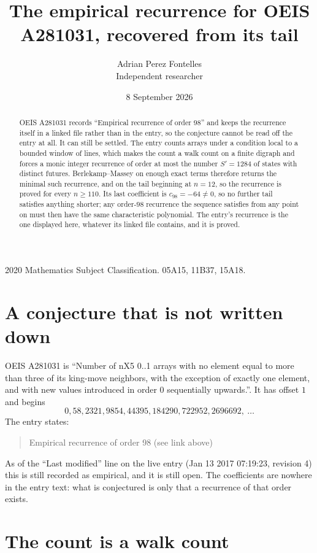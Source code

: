 \documentclass[11pt,a4paper]{article}
\title{The empirical recurrence for OEIS A281031, recovered from its tail}
\author{Adrian Perez Fontelles\\ \small Independent researcher}
\date{8 September 2026}
\theoremstyle{plain}
\theoremstyle{definition}
\begin{document}
\maketitle

\begin{abstract}
OEIS A281031 records ``Empirical recurrence of order $98$'' and keeps the recurrence itself in
a linked file rather than in the entry, so the conjecture cannot be read off the entry at all.
It can still be settled. The entry counts arrays under a condition local to a bounded window of
lines, which makes the count a walk count on a finite digraph and forces a monic integer
recurrence of order at most the number $S'=1284$ of states with distinct futures. Berlekamp--Massey on
enough exact terms therefore returns the minimal such recurrence, and on the tail beginning at $n=12$, so the recurrence is proved for every $n\ge110$.
Its last coefficient is $c_{98}=-64\neq0$, so no further tail satisfies anything
shorter; any order-$98$ recurrence the sequence satisfies from any point on must then have
the same characteristic polynomial. The entry's recurrence is the one displayed here, whatever
its linked file contains, and it is proved.
\end{abstract}

\noindent\small 2020 Mathematics Subject Classification. 05A15, 11B37, 15A18.\normalsize

\section{A conjecture that is not written down}

OEIS A281031 is ``Number of nX5 0..1 arrays with no element equal to more than three of its king-move neighbors, with the exception of exactly one element, and with new values introduced in order 0 sequentially upwards.''. It has offset $1$ and begins
\[
0, 58, 2321, 9854, 44395, 184290, 722952, 2696692,\ \dots
\]
The entry states:
\begin{quote}
Empirical recurrence of order 98 (see link above)
\end{quote}
As of the ``Last modified'' line on the live entry (Jan 13 2017 07:19:23, revision 4)
this is still recorded as empirical, and it is still open. The coefficients are nowhere in the
entry text: what is conjectured is only that a recurrence of that order exists.

\section{The count is a walk count}
\end{document}
